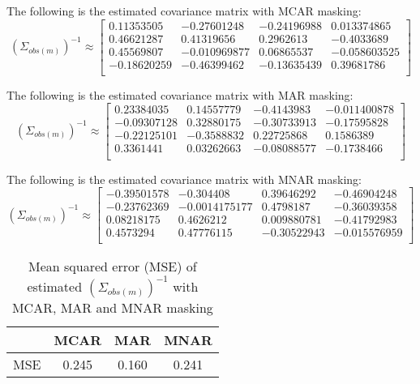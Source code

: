 \documentclass{article}
\begin{document}
The following is the estimated covariance matrix with MCAR masking:
\begin{equation}
{(\Sigma_{obs(m)})}^{-1} \approx
\begin{bmatrix}
0.11353505&-0.27601248&-0.24196988&0.013374865\\ 
0.46621287&0.41319656&0.2962613&-0.4033689\\
0.45569807&-0.010969877&0.06865537&-0.058603525\\
-0.18620259&-0.46399462&-0.13635439&0.39681786\\
\end{bmatrix}
\end{equation}

The following is the estimated covariance matrix with MAR masking:
\begin{equation}
{(\Sigma_{obs(m)})}^{-1} \approx
\begin{bmatrix}
0.23384035&0.14557779&-0.4143983&-0.011400878\\
-0.09307128&0.32880175&-0.30733913&-0.17595828\\
-0.22125101&-0.3588832&0.22725868&0.1586389\\
0.3361441&0.03262663&-0.08088577&-0.1738466\\
\end{bmatrix}
\end{equation}

The following is the estimated covariance matrix with MNAR masking:
\begin{equation}
{(\Sigma_{obs(m)})}^{-1} \approx
\begin{bmatrix}
-0.39501578&-0.304408&0.39646292&-0.46904248\\
-0.23762369&-0.0014175177&0.4798187&-0.36039358\\
0.08218175&0.4626212&0.009880781&-0.41792983\\
0.4573294&0.47776115&-0.30522943&-0.015576959\\
\end{bmatrix}
\end{equation}


\begin{table}[h!]
\centering
\begin{tabular}{|c| c c c|} 
 \hline
  & MCAR & MAR & MNAR \\ [0.5ex]
 \hline 
 MSE & 0.245 & 0.160 & 0.241 \\ 
 [1ex] 
 \hline
\end{tabular}
\caption{Mean squared error (MSE) of estimated ${(\Sigma_{obs(m)})}^{-1}$ with MCAR, MAR and MNAR masking}
\label{table:2}
\end{table}
\end{document}
